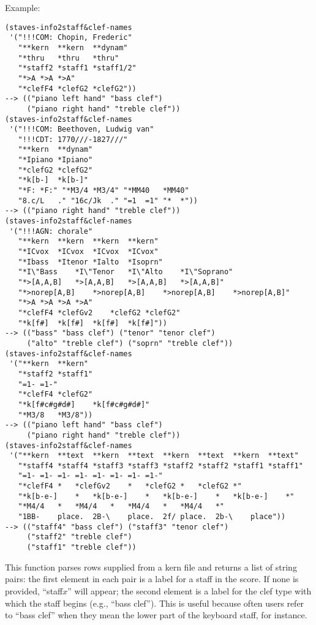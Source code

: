 \vspace{0.5cm}
\noindent Example:
\begin{verbatim}
(staves-info2staff&clef-names
 '("!!!COM: Chopin, Frederic"
   "**kern	**kern	**dynam"
   "*thru	*thru	*thru"
   "*staff2	*staff1	*staff1/2"
   "*>A	*>A	*>A"
   "*clefF4	*clefG2	*clefG2"))
--> (("piano left hand" "bass clef")
     ("piano right hand" "treble clef"))
(staves-info2staff&clef-names
 '("!!!COM: Beethoven, Ludwig van"
   "!!!CDT: 1770///-1827///"
   "**kern	**dynam"
   "*Ipiano	*Ipiano"
   "*clefG2	*clefG2"
   "*k[b-]	*k[b-]"
   "*F:	*F:" "*M3/4	*M3/4" "*MM40	*MM40"
   "8.c/L	." "16c/Jk	." "=1	=1" "*	*"))
--> (("piano right hand" "treble clef"))
(staves-info2staff&clef-names
 '("!!!AGN:	chorale"
   "**kern	**kern	**kern	**kern"
   "*ICvox	*ICvox	*ICvox	*ICvox"
   "*Ibass	*Itenor	*Ialto	*Isoprn"
   "*I\"Bass	*I\"Tenor	*I\"Alto	*I\"Soprano"
   "*>[A,A,B]	*>[A,A,B]	*>[A,A,B]	*>[A,A,B]"
   "*>norep[A,B]	*>norep[A,B]	*>norep[A,B]	*>norep[A,B]"
   "*>A	*>A	*>A	*>A"
   "*clefF4	*clefGv2	*clefG2	*clefG2"
   "*k[f#]	*k[f#]	*k[f#]	*k[f#]"))
--> (("bass" "bass clef") ("tenor" "tenor clef")
     ("alto" "treble clef") ("soprn" "treble clef"))
(staves-info2staff&clef-names
 '("**kern	**kern"
   "*staff2	*staff1"
   "=1-	=1-"
   "*clefF4	*clefG2"
   "*k[f#c#g#d#]	*k[f#c#g#d#]"
   "*M3/8	*M3/8"))
--> (("piano left hand" "bass clef")
     ("piano right hand" "treble clef"))
(staves-info2staff&clef-names
 '("**kern	**text	**kern	**text	**kern	**text	**kern	**text"
   "*staff4	*staff4	*staff3	*staff3	*staff2	*staff2	*staff1	*staff1"
   "=1-	=1-	=1-	=1-	=1-	=1-	=1-	=1-"
   "*clefF4	*	*clefGv2	*	*clefG2	*	*clefG2	*"
   "*k[b-e-]	*	*k[b-e-]	*	*k[b-e-]	*	*k[b-e-]	*"
   "*M4/4	*	*M4/4	*	*M4/4	*	*M4/4	*"
   "1BB-	place.	2B-\	place.	2f/	place.	2b-\	place"))
--> (("staff4" "bass clef") ("staff3" "tenor clef")
     ("staff2" "treble clef")
     ("staff1" "treble clef"))
\end{verbatim}

\noindent This function parses rows supplied from a
kern file and returns a list of string pairs: the first
element in each pair is a label for a staff in the
score. If none is provided, ``staff$x$'' will appear;
the second element is a label for the clef type with
which the staff begins (e.g., ``bass clef''). This is
useful because often users refer to ``bass clef''
when they mean the lower part of the keyboard staff,
for instance.















